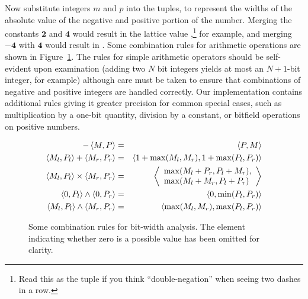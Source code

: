 \documentclass{acmconf}
\begin{document}
Now substitute integers $m$ and $p$ into the tuples, to represent the
widths of the absolute value of the negative and positive portion of
the number.  Merging the constants $\mathbf{2}$ and $\mathbf{4}$ would
result in the lattice
value ,\footnote{Read this as the tuple  if you think
  ``double-negation'' when seeing two dashes in a row.}
for example, and merging $\mathbf{-4}$ with $\mathbf{4}$ would result in
.  Some combination rules for arithmetic operations are
shown in Figure~\ref{fig:bitrules}.  The rules for simple arithmetic
operators should be self-evident upon examination (adding two $N$ bit
integers yields at most an $N+1$-bit integer, for example) although
care must be taken to ensure that combinations of negative and
positive integers are handled correctly.  Our implementation contains
additional rules giving it greater precision for common special cases,
such as multiplication by
a one-bit quantity, division by a constant, or bitfield operations on
positive numbers.
\begin{figure}[tp]
\begin{eqnarray*}
-\left\langle M,P \right\rangle &=& \left\langle P,M \right\rangle\\
\left\langle M_l,P_l \right\rangle + \left\langle M_r,P_r \right\rangle &=& \left\langle 1+\max(M_l,M_r),1+\max(P_l,P_r) \right\rangle\\
\left\langle M_l,P_l \right\rangle \times \left\langle M_r,P_r \right\rangle &=&
\left\langle \begin{array}{l}\max(M_l+P_r,P_l+M_r),\\
                       \max(M_l+M_r,P_l+P_r)\end{array} \right\rangle\\
\left\langle 0,P_l \right\rangle \wedge \left\langle 0,P_r \right\rangle &=& \left\langle 0,\min(P_l,P_r) \right\rangle\\
\left\langle M_l,P_l \right\rangle\wedge \left\langle M_r,P_r \right\rangle &=& \left\langle \max(M_l,M_r),\max(P_l,P_r) \right\rangle
\end{eqnarray*}%
\caption{Some combination rules for bit-width analysis.  The 
  element indicating whether zero is a possible value has been omitted
  for clarity.}\label{fig:bitrules}
\end{figure}
\end{document}
